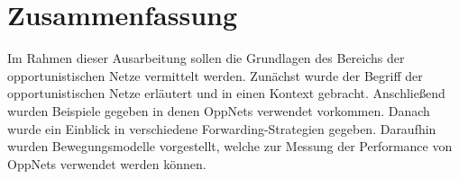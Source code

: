 \documentclass[a4paper, 12pt]{article}
\begin{document}

\section{Zusammenfassung}
\label{sec:conclusion}
Im Rahmen dieser Ausarbeitung sollen die Grundlagen des Bereichs der opportunistischen Netze vermittelt werden. Zunächst wurde der Begriff der  opportunistischen Netze erläutert und in einen Kontext gebracht. Anschließend wurden Beispiele gegeben in denen OppNets verwendet vorkommen. Danach wurde ein Einblick in verschiedene Forwarding-Strategien gegeben. Daraufhin wurden Bewegungsmodelle vorgestellt, welche zur Messung der Performance von OppNets verwendet werden können.




\end{document}
